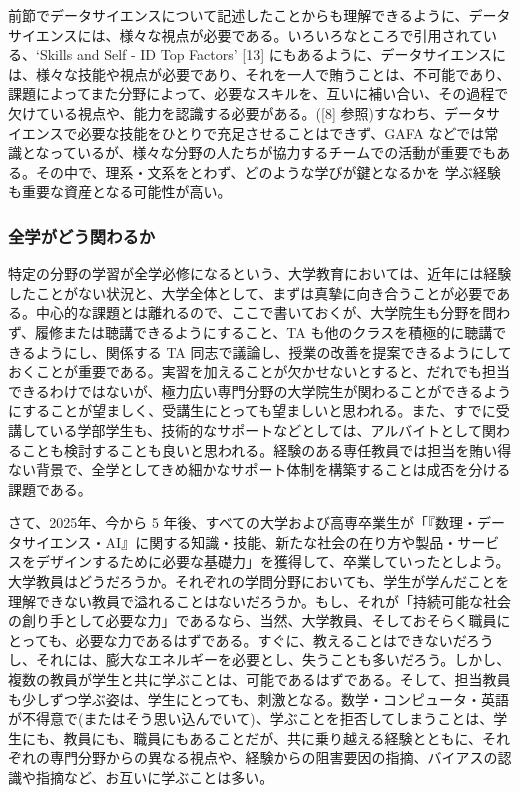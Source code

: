 \documentclass[
]{bxjsbook}
\theoremstyle{definition}
\theoremstyle{definition}
\theoremstyle{definition}
\theoremstyle{definition}
\theoremstyle{remark}
\begin{document}
前節でデータサイエンスについて記述したことからも理解できるように、データサイエンスには、様々な視点が必要である。いろいろなところで引用されている、`Skills and Self - ID Top Factors' {[}13{]} にもあるように、データサイエンスには、様々な技能や視点が必要であり、それを一人で賄うことは、不可能であり、課題によってまた分野によって、必要なスキルを、互いに補い合い、その過程で欠けている視点や、能力を認識する必要がある。({[}8{]} 参照)すなわち、データサイエンスで必要な技能をひとりで充足させることはできず、GAFA などでは常識となっているが、様々な分野の人たちが協力するチームでの活動が重要でもある。その中で、理系・文系をとわず、どのような学びが鍵となるかを 学ぶ経験も重要な資産となる可能性が高い。

\hypertarget{ux5168ux5b66ux304cux3069ux3046ux95a2ux308fux308bux304b}{%
\subsubsection{全学がどう関わるか}\label{ux5168ux5b66ux304cux3069ux3046ux95a2ux308fux308bux304b}}

特定の分野の学習が全学必修になるという、大学教育においては、近年には経験したことがない状況と、大学全体として、まずは真摯に向き合うことが必要である。中心的な課題とは離れるので、ここで書いておくが、大学院生も分野を問わず、履修または聴講できるようにすること、TA も他のクラスを積極的に聴講できるようにし、関係する TA 同志で議論し、授業の改善を提案できるようにしておくことが重要である。実習を加えることが欠かせないとすると、だれでも担当できるわけではないが、極力広い専門分野の大学院生が関わることができるようにすることが望ましく、受講生にとっても望ましいと思われる。また、すでに受講している学部学生も、技術的なサポートなどとしては、アルバイトとして関わることも検討することも良いと思われる。経験のある専任教員では担当を賄い得ない背景で、全学としてきめ細かなサポート体制を構築することは成否を分ける課題である。

さて、2025年、今から 5 年後、すべての大学および高専卒業生が「『数理・データサイエンス・AI』に関する知識・技能、新たな社会の在り方や製品・サービスをデザインするために必要な基礎力」を獲得して、卒業していったとしよう。大学教員はどうだろうか。それぞれの学問分野においても、学生が学んだことを理解できない教員で溢れることはないだろうか。もし、それが「持続可能な社会の創り手として必要な力」であるなら、当然、大学教員、そしておそらく職員にとっても、必要な力であるはずである。すぐに、教えることはできないだろうし、それには、膨大なエネルギーを必要とし、失うことも多いだろう。しかし、複数の教員が学生と共に学ぶことは、可能であるはずである。そして、担当教員も少しずつ学ぶ姿は、学生にとっても、刺激となる。数学・コンピュータ・英語が不得意で(またはそう思い込んでいて)、学ぶことを拒否してしまうことは、学生にも、教員にも、職員にもあることだが、共に乗り越える経験とともに、それぞれの専門分野からの異なる視点や、経験からの阻害要因の指摘、バイアスの認識や指摘など、お互いに学ぶことは多い。
\end{document}
